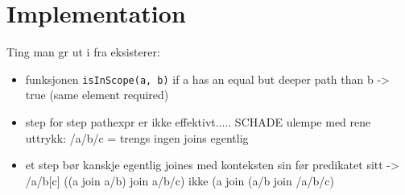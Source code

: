 \chapter{Implementation}
\label{chapter:implementation}

Ting man g\a r ut i fra eksisterer:
\begin{itemize}
\item funksjonen \verb!isInScope(a, b)! if a has an equal but deeper path than b -> true (same element required)
\item step for step pathexpr er ikke effektivt..... SCHADE ulempe med rene uttrykk: /a/b/c = trengs ingen joins egentlig
\item et step b\o r kanskje egentlig joines med konteksten sin f\o r predikatet sitt -> /a/b[c] ((a join a/b) join a/b/c) ikke (a join (a/b join /a/b/c)
\end{itemize}